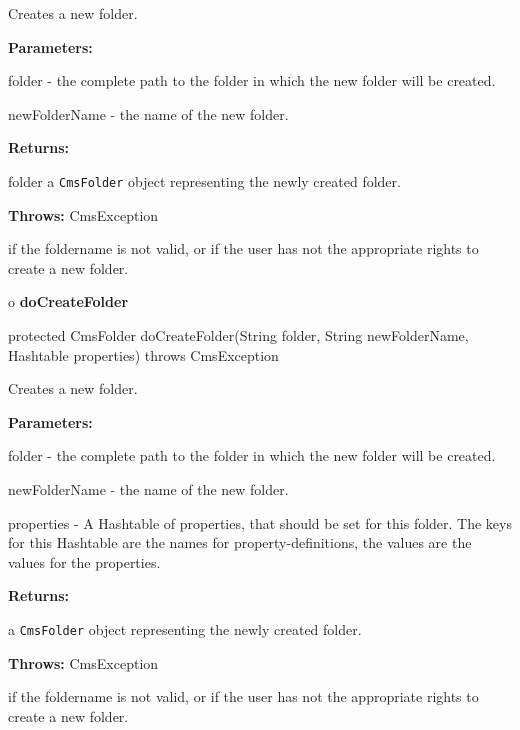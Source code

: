 \begin{description}
\htmlDD Creates a new folder. 

\begin{description}
\item {\bf Parameters:}  

folder - the complete path to the folder in which the new folder will be
created.  

newFolderName - the name of the new folder.  
\item {\bf Returns:}  

folder a {\tt CmsFolder} object representing the newly created folder.  
\item {\bf Throws:} CmsException  

if the foldername is not valid, or if the user has not the appropriate rights
to create a new folder.  
\end{description}

\end{description}

o {\bf doCreateFolder} 

\begin{PRE}
 protected CmsFolder doCreateFolder(String folder,
                                    String newFolderName,
                                    Hashtable properties) throws CmsException
\end{PRE}

\begin{description}
\htmlDD Creates a new folder. 

\begin{description}
\item {\bf Parameters:}  

folder - the complete path to the folder in which the new folder will be
created.  

newFolderName - the name of the new folder.  

properties - A Hashtable of properties, that should be set for this folder.
The keys for this Hashtable are the names for property-definitions, the values
are the values for the properties.  
\item {\bf Returns:}  

a {\tt CmsFolder} object representing the newly created folder.  
\item {\bf Throws:} CmsException  

if the foldername is not valid, or if the user has not the appropriate rights
to create a new folder.  
\end{description}

\end{description}

